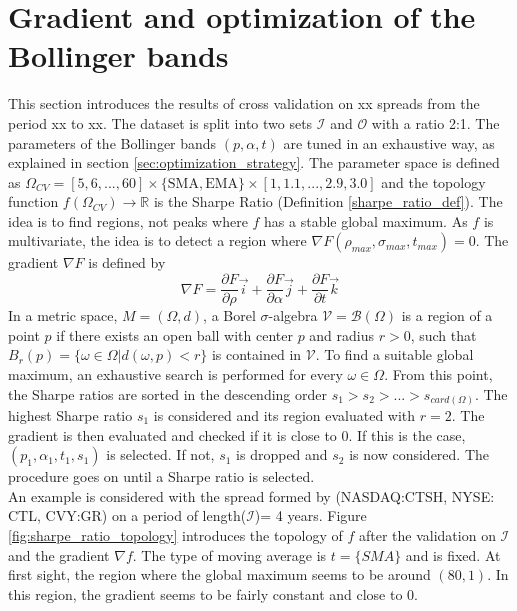 \documentclass[11pt,a4,twosided,singlespacing,titlepagenumber=on]{scrreprt}
\numberwithin{equation}{chapter} %
\theoremstyle{remark}
\begin{document}
\section{Gradient and optimization of the Bollinger bands}
This section introduces the results of cross validation on xx spreads from the period xx to xx. The dataset is split into two sets $\mathcal{I}$ and $\mathcal{O}$ with a ratio 2:1. The parameters of the Bollinger bands $(p, \alpha, t)$ are tuned in an exhaustive way, as explained in section \ref{sec:optimization_strategy}. The parameter space is defined as $\Omega_{CV}  = [5,6,...,60] \times \{\text{SMA}, \text{EMA}\} \times [1,1.1,...,2.9,3.0]$ and the topology function $f(\Omega_{CV}) \rightarrow \mathbb{R}$ is the Sharpe Ratio (Definition \ref{sharpe_ratio_def}). The idea is to find regions, not peaks where $f$ has a stable global maximum. As $f$ is multivariate, the idea is to detect a region where $\nabla F(\rho_{max}, \sigma_{max}, t_{max}) = 0$. The gradient $\nabla F$ is defined by
\begin{equation}
\nabla F = \frac{\partial F}{\partial \rho} \vec{i} + \frac{\partial F}{\partial \alpha} \vec{j} + \frac{\partial F}{\partial t} \vec{k}
\end{equation}
In a metric space, $M = (\Omega, d)$, a Borel $\sigma$-algebra $\mathcal{V} = \mathcal{B}(\Omega)$ is a region of a point $p$ if there exists an open ball with center $p$ and radius $r > 0$, such that $B_r(p) = \{\omega \in \Omega | d(\omega, p) < r\}$ is contained in $\mathcal{V}$. To find a suitable global maximum, an exhaustive search is performed for every $\omega \in \Omega$. From this point, the Sharpe ratios are sorted in the descending order $s_1 > s_2 > ... > s_{card(\Omega)}$. The highest Sharpe ratio $s_1$ is considered and its region evaluated with $r=2$. The gradient is then evaluated and checked if it is close to 0. If this is the case, $(p_1, \alpha_1, t_1, s_1)$ is selected. If not, $s_1$ is dropped and $s_2$ is now considered. The procedure goes on until a Sharpe ratio is selected. \\
An example is considered with the spread formed by (NASDAQ:CTSH, NYSE: CTL, CVY:GR) on a period of length($\mathcal{I}$)= 4 years. Figure \ref{fig:sharpe_ratio_topology} introduces the topology of $f$ after the validation on $\mathcal{I}$ and the gradient $\nabla f$. The type of moving average is $t = \{ SMA \}$ and is fixed. At first sight, the region where the global maximum seems to be around $(80,1)$. In this region, the gradient seems to be fairly constant and close to 0.
\end{document}
